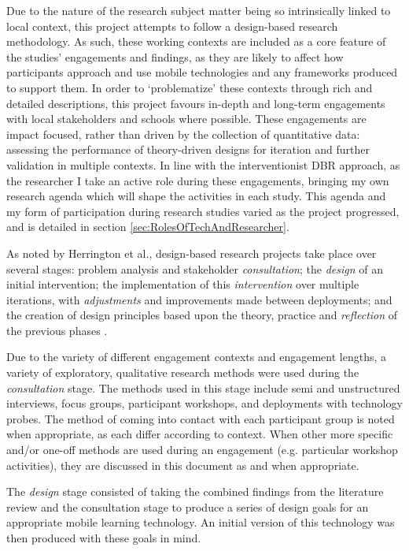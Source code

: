 Due to the nature of the research subject matter being so intrinsically linked to local context, this project attempts to follow a design-based research methodology. As such, these working contexts are included as a core feature of the studies' engagements and findings, as they are likely to affect how participants approach and use mobile technologies and any frameworks produced to support them. In order to `problematize' these contexts through rich and detailed descriptions, this project favours in-depth and long-term engagements with local stakeholders and schools where possible. These engagements are impact focused, rather than driven by the collection of quantitative data: assessing the performance of theory-driven designs for iteration and further validation in multiple contexts. In line with the interventionist DBR approach, as the researcher I take an active role during these engagements, bringing my own research agenda which will shape the activities in each study. This agenda and my form of participation during research studies varied as the project progressed, and is detailed in section \ref{sec:RolesOfTechAndResearcher}.

As noted by Herrington et al., design-based research projects take place over several stages: problem analysis and stakeholder \textit{consultation}; the \textit{design} of an initial intervention; the implementation of this \textit{intervention} over multiple iterations, with \textit{adjustments} and improvements made between deployments; and the creation of design principles based upon the theory, practice and \textit{reflection} of the previous phases \citep{herrington2009}. 

Due to the variety of different engagement contexts and engagement lengths, a variety of exploratory, qualitative research methods were used during the \textit{consultation} stage. The methods used in this stage include semi and unstructured interviews, focus groups, participant workshops, and deployments with technology probes. The method of coming into contact with each participant group is noted when appropriate, as each differ according to context. When other more specific and/or one-off methods are used during an engagement (e.g. particular workshop activities), they are discussed in this document as and when appropriate. 

The \textit{design} stage consisted of taking the combined findings from the literature review and the consultation stage to produce a series of design goals for an appropriate mobile learning technology. An initial version of this technology was then produced with these goals in mind. 

